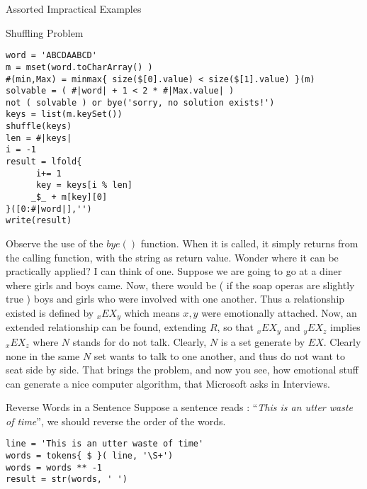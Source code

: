\begin{section}{Assorted Impractical Examples}
\begin{subsection}{Shuffling Problem}
\begin{center}\begin{minipage}{\linewidth}
\begin{lstlisting}[style=JexlStyle]
word = 'ABCDAABCD'
m = mset(word.toCharArray() )
#(min,Max) = minmax{ size($[0].value) < size($[1].value) }(m)
solvable = ( #|word| + 1 < 2 * #|Max.value| )
not ( solvable ) or bye('sorry, no solution exists!')
keys = list(m.keySet())
shuffle(keys)
len = #|keys|
i = -1 
result = lfold{ 
      i+= 1 
      key = keys[i % len]  
     _$_ + m[key][0]           
}([0:#|word|],'')
write(result)
\end{lstlisting}  
\end{minipage}\end{center}
Observe the use of the $bye()$ function. When it is called, it simply returns
from the calling function, with the string as return value.
Wonder where it can be practically applied? I can think of one.
Suppose we are going to go at a diner where girls and boys came. 
Now, there would be ( if the soap operas are slightly true ) boys and girls who were
involved with one another. Thus a relationship existed is defined by $_xEX_y$ 
which means $x,y$ were emotionally attached. 
Now, an extended relationship can be found, extending $R$, so that $_xEX_y$ and $_yEX_z$ 
implies $_xEX_z$ where $N$ stands for do not talk. Clearly, $N$ is a set generate by $EX$.
Clearly none in the same $N$ set wants to talk to one another, and thus
do not want to seat side by side. That brings the problem, and 
now you see, how emotional stuff can generate a nice computer algorithm, 
that Microsoft asks in Interviews.

\end{subsection}

\begin{subsection}{Reverse Words in a Sentence}
Suppose a sentence reads : ``\emph{This is an utter waste of time}'', 
we should reverse the order of the words. 

\begin{center}\begin{minipage}{\linewidth}
\begin{lstlisting}[style=JexlStyle]
line = 'This is an utter waste of time'
words = tokens{ $ }( line, '\S+')
words = words ** -1
result = str(words, ' ') 
\end{lstlisting}  
\end{minipage}\end{center}


\end{subsection}
\end{section}
